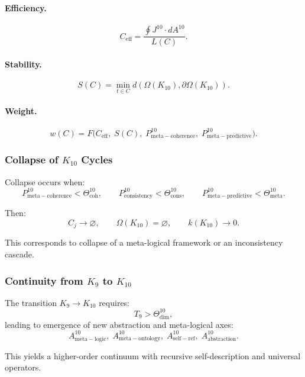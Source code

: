 \paragraph{Efficiency.}
\[
  C_{\mathrm{eff}} =
  \frac{\oint J^{10}\cdot dA^{10}}{L(C)}.
\]

\paragraph{Stability.}
\[
  S(C) 
   = \min_{t\in C}
     d(\Omega(K_{10}), \partial\Omega(K_{10})).
\]

\paragraph{Weight.}
\[
  w(C)
    = F\big(
        C_{\mathrm{eff}},\;
        S(C),\;
        P^{10}_{\mathrm{meta\!-\!coherence}},\;
        P^{10}_{\mathrm{meta\!-\!predictive}}
      \big).
\]


\subsubsection{Collapse of $K_{10}$ Cycles}

Collapse occurs when:
\[
  P^{10}_{\mathrm{meta\!-\!coherence}} < \Theta^{10}_{\mathrm{coh}},\qquad
  P^{10}_{\mathrm{consistency}} < \Theta^{10}_{\mathrm{cons}},\qquad
  P^{10}_{\mathrm{meta\!-\!predictive}} < \Theta^{10}_{\mathrm{meta}}.
\]

Then:
\[
  C_j \to \varnothing,\qquad
  \Omega(K_{10})=\varnothing,\qquad
  k(K_{10})\to 0.
\]

This corresponds to collapse of a meta-logical framework or an
inconsistency cascade.


\subsubsection{Continuity from \texorpdfstring{$K_9$}{K_9} to $K_{10}$}

The transition $K_9\to K_{10}$ requires:
\[
  T_9 > \Theta^{10}_{\mathrm{dim}},
\]
leading to emergence of new abstraction and meta-logical axes:
\[
  A^{10}_{\mathrm{meta\!-\!logic}},\;
  A^{10}_{\mathrm{meta\!-\!ontology}},\;
  A^{10}_{\mathrm{self\!-\!ref}},\;
  A^{10}_{\mathrm{abstraction}}.
\]

This yields a higher-order continuum with recursive self-description and
universal operators.
